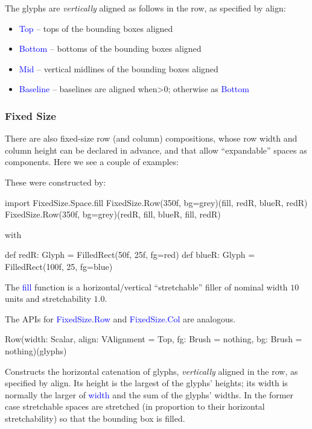 \documentclass[12pt,a4paper]{article}
\def\Scala#1{\textcolor{blue}{\textsf{#1}}}
\def\SSS#1{\subsubsection*{#1}}
\begin{document}
The glyphs are \textit{vertically} aligned as follows in the row, as specified
by align:

\begin{itemize}
\item \Scala{Top}   --     tops of the bounding boxes aligned
\item \Scala{Bottom} --    bottoms of the bounding boxes aligned
\item \Scala{Mid} --       vertical midlines of the bounding boxes aligned
\item \Scala{Baseline} --  baselines are aligned when>0; otherwise as \Scala{Bottom}
\end{itemize}

\SSS{Fixed Size}
There are also fixed-size row (and column)
compositions, whose row width and column height can be declared in advance,
and that allow ``expandable'' spaces as components. Here we see a
couple of examples:

\begin{center}
\quad\quad
{}
\end{center}

These were constructed by:
\begin{scala}
import FixedSize.Space.fill
FixedSize.Row(350f, bg=grey)(fill, redR, blueR, redR)
FixedSize.Row(350f, bg=grey)(redR, fill, blueR, fill, redR)
\end{scala}
with
\begin{scala}
def redR:  Glyph = FilledRect(50f, 25f, fg=red)
def blueR: Glyph = FilledRect(100f, 25, fg=blue)
\end{scala}

The \Scala{fill} function is a horizontal/vertical ``stretchable''
filler of nominal width $10$ units and stretchability $1.0$.

The APIs for \Scala{FixedSize.Row} and \Scala{FixedSize.Col} are analogous.
\begin{scala}
        Row(width: Scalar,
            align: VAlignment = Top,
            fg:    Brush      = nothing,
            bg:    Brush      = nothing)(glyphs)
\end{scala}
Constructs the horizontal catenation of glyphs, \textit{vertically} aligned
in the row, as specified by align.  Its height is the largest of the
glyphs' heights; its width is normally the larger of \Scala{width} and the
sum of the glyphs' widths.  In the former case stretchable spaces are
stretched (in proportion to their horizontal stretchability) so that
the bounding box is filled.
\end{document}
